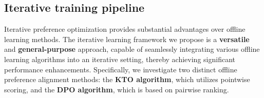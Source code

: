 \subsection{Iterative training pipeline} \label{pipeline_training}



    


        

       


Iterative preference optimization provides substantial advantages over offline learning methods. The iterative learning framework we propose is a \textbf{versatile} and \textbf{general-purpose} approach, capable of seamlessly integrating various offline learning algorithms into an iterative setting, thereby achieving significant performance enhancements. Specifically, we investigate two distinct offline preference alignment methods: the \textbf{KTO algorithm}, which utilizes pointwise scoring, and the \textbf{DPO algorithm}, which is based on pairwise ranking.

